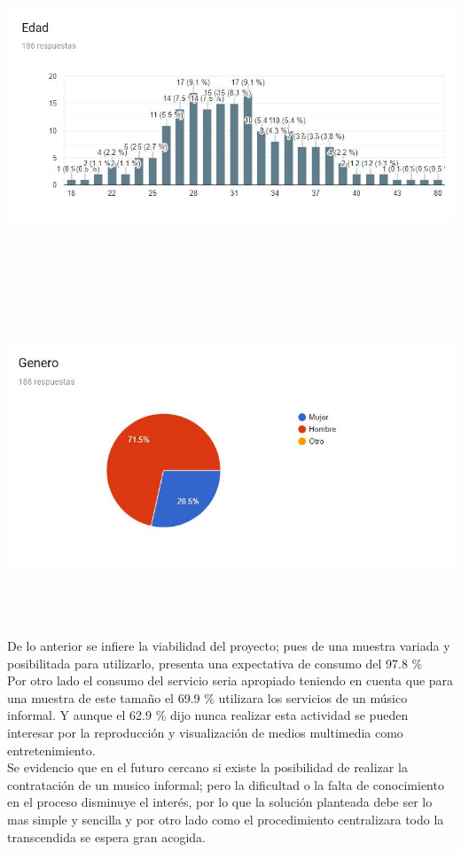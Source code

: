 \begin{center}
\includegraphics[width=16cm, height=10cm,keepaspectratio=true]{Desarrollo/RecoleccionInformacion/imgs/edad.JPG}
\includegraphics[width=16cm, height=10cm,keepaspectratio=true]{Desarrollo/RecoleccionInformacion/imgs/genero.JPG}
\end{center}
De lo anterior se infiere la viabilidad del proyecto; pues de una muestra variada y posibilitada para utilizarlo, presenta una expectativa de consumo del 97.8 \% \\
Por otro lado el consumo del servicio seria apropiado teniendo en cuenta que para una muestra de este tamaño el 69.9 \% utilizara los servicios de un músico informal. Y aunque el 62.9 \% dijo nunca realizar esta actividad se pueden interesar por la reproducción y visualización de medios multimedia como entretenimiento.\\
Se evidencio que en el futuro cercano si existe la posibilidad de realizar la contratación de un musico informal; pero la dificultad o la falta de conocimiento en el proceso disminuye el interés, por lo que la solución planteada debe ser lo mas simple y sencilla y por otro lado como el procedimiento centralizara todo la transcendida se espera gran acogida.
